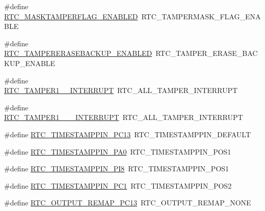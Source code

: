 \begin{DoxyCompactItemize}
\item 
\#define \hyperlink{group___h_a_l___r_t_c___aliased___defines_gab9424e57ef6067b1d7f5030ee45192d5}{R\+T\+C\+\_\+\+M\+A\+S\+K\+T\+A\+M\+P\+E\+R\+F\+L\+A\+G\+\_\+\+E\+N\+A\+B\+L\+ED}~R\+T\+C\+\_\+\+T\+A\+M\+P\+E\+R\+M\+A\+S\+K\+\_\+\+F\+L\+A\+G\+\_\+\+E\+N\+A\+B\+LE
\item 
\#define \hyperlink{group___h_a_l___r_t_c___aliased___defines_ga4a78a492baabe7132ddfcf94cf7805c0}{R\+T\+C\+\_\+\+T\+A\+M\+P\+E\+R\+E\+R\+A\+S\+E\+B\+A\+C\+K\+U\+P\+\_\+\+E\+N\+A\+B\+L\+ED}~R\+T\+C\+\_\+\+T\+A\+M\+P\+E\+R\+\_\+\+E\+R\+A\+S\+E\+\_\+\+B\+A\+C\+K\+U\+P\+\_\+\+E\+N\+A\+B\+LE
\item 
\#define \hyperlink{group___h_a_l___r_t_c___aliased___defines_gad52c576aeb40eeeed3274e6a8c5cf83a}{R\+T\+C\+\_\+\+T\+A\+M\+P\+E\+R1\+\_\+\_\+\+I\+N\+T\+E\+R\+R\+U\+PT}~R\+T\+C\+\_\+\+A\+L\+L\+\_\+\+T\+A\+M\+P\+E\+R\+\_\+\+I\+N\+T\+E\+R\+R\+U\+PT
\item 
\#define \hyperlink{group___h_a_l___r_t_c___aliased___defines_ga30a97d2cbfeca6b663b9f116e13c511a}{R\+T\+C\+\_\+\+T\+A\+M\+P\+E\+R1\+\_\+\_\+\_\+\+I\+N\+T\+E\+R\+R\+U\+PT}~R\+T\+C\+\_\+\+A\+L\+L\+\_\+\+T\+A\+M\+P\+E\+R\+\_\+\+I\+N\+T\+E\+R\+R\+U\+PT
\item 
\#define \hyperlink{group___h_a_l___r_t_c___aliased___defines_ga86b6c9d9b06b1ab23722bf02799adfca}{R\+T\+C\+\_\+\+T\+I\+M\+E\+S\+T\+A\+M\+P\+P\+I\+N\+\_\+\+P\+C13}~R\+T\+C\+\_\+\+T\+I\+M\+E\+S\+T\+A\+M\+P\+P\+I\+N\+\_\+\+D\+E\+F\+A\+U\+LT
\item 
\#define \hyperlink{group___h_a_l___r_t_c___aliased___defines_ga8d806818f1fcdaf744042a19563a8052}{R\+T\+C\+\_\+\+T\+I\+M\+E\+S\+T\+A\+M\+P\+P\+I\+N\+\_\+\+P\+A0}~R\+T\+C\+\_\+\+T\+I\+M\+E\+S\+T\+A\+M\+P\+P\+I\+N\+\_\+\+P\+O\+S1
\item 
\#define \hyperlink{group___h_a_l___r_t_c___aliased___defines_ga06c626929730d0b055830978be00b438}{R\+T\+C\+\_\+\+T\+I\+M\+E\+S\+T\+A\+M\+P\+P\+I\+N\+\_\+\+P\+I8}~R\+T\+C\+\_\+\+T\+I\+M\+E\+S\+T\+A\+M\+P\+P\+I\+N\+\_\+\+P\+O\+S1
\item 
\#define \hyperlink{group___h_a_l___r_t_c___aliased___defines_ga8bed03c3348ec3005e7b80e73fd13cc0}{R\+T\+C\+\_\+\+T\+I\+M\+E\+S\+T\+A\+M\+P\+P\+I\+N\+\_\+\+P\+C1}~R\+T\+C\+\_\+\+T\+I\+M\+E\+S\+T\+A\+M\+P\+P\+I\+N\+\_\+\+P\+O\+S2
\item 
\#define \hyperlink{group___h_a_l___r_t_c___aliased___defines_ga677d55aef2a7915a4a75befab8a5abaf}{R\+T\+C\+\_\+\+O\+U\+T\+P\+U\+T\+\_\+\+R\+E\+M\+A\+P\+\_\+\+P\+C13}~R\+T\+C\+\_\+\+O\+U\+T\+P\+U\+T\+\_\+\+R\+E\+M\+A\+P\+\_\+\+N\+O\+NE

\end{DoxyCompactItemize}
